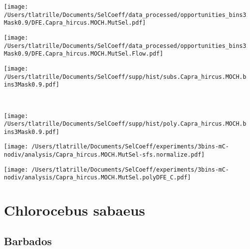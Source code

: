 \documentclass{article}
\begin{document}
    \begin{minipage}{0.32\linewidth}
        \texttt{[image: /Users/tlatrille/Documents/SelCoeff/data\_processed/opportunities\_bins3Mask0.9/DFE.Capra\_hircus.MOCH.MutSel.pdf]}
    \end{minipage}
    \begin{minipage}{0.32\linewidth}
        \texttt{[image: /Users/tlatrille/Documents/SelCoeff/data\_processed/opportunities\_bins3Mask0.9/DFE.Capra\_hircus.MOCH.MutSel.Flow.pdf]}
    \end{minipage}
    \begin{minipage}{0.32\linewidth}
        \texttt{[image: /Users/tlatrille/Documents/SelCoeff/supp/hist/subs.Capra\_hircus.MOCH.bins3Mask0.9.pdf]}
    \end{minipage}
    \\
    \begin{minipage}{0.32\linewidth}
        \texttt{[image: /Users/tlatrille/Documents/SelCoeff/supp/hist/poly.Capra\_hircus.MOCH.bins3Mask0.9.pdf]}
    \end{minipage}
    \begin{minipage}{0.32\linewidth}
        \texttt{[image: /Users/tlatrille/Documents/SelCoeff/experiments/3bins-mC-nodiv/analysis/Capra\_hircus.MOCH.MutSel-sfs.normalize.pdf]}
    \end{minipage}
    \begin{minipage}{0.32\linewidth}
        \texttt{[image: /Users/tlatrille/Documents/SelCoeff/experiments/3bins-mC-nodiv/analysis/Capra\_hircus.MOCH.MutSel.polyDFE\_C.pdf]}
    \end{minipage}
    \section{Chlorocebus sabaeus}

    \subsection{Barbados}
\end{document}
